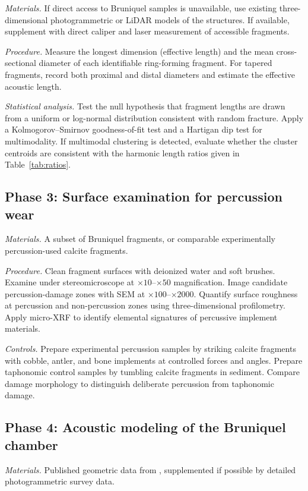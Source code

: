 \documentclass[12pt]{article}
\begin{document}
\textit{Materials.} If direct access to Bruniquel samples is unavailable, use existing three-dimensional photogrammetric or LiDAR models of the structures. If available, supplement with direct caliper and laser measurement of accessible fragments.

\textit{Procedure.} Measure the longest dimension (effective length) and the mean cross-sectional diameter of each identifiable ring-forming fragment. For tapered fragments, record both proximal and distal diameters and estimate the effective acoustic length.

\textit{Statistical analysis.} Test the null hypothesis that fragment lengths are drawn from a uniform or log-normal distribution consistent with random fracture. Apply a Kolmogorov--Smirnov goodness-of-fit test and a Hartigan dip test for multimodality. If multimodal clustering is detected, evaluate whether the cluster centroids are consistent with the harmonic length ratios given in Table~\ref{tab:ratios}.

\subsection*{Phase 3: Surface examination for percussion wear}

\textit{Materials.} A subset of Bruniquel fragments, or comparable experimentally percussion-used calcite fragments.

\textit{Procedure.} Clean fragment surfaces with deionized water and soft brushes. Examine under stereomicroscope at $\times 10$--$\times 50$ magnification. Image candidate percussion-damage zones with SEM at $\times 100$--$\times 2000$. Quantify surface roughness at percussion and non-percussion zones using three-dimensional profilometry. Apply micro-XRF to identify elemental signatures of percussive implement materials.

\textit{Controls.} Prepare experimental percussion samples by striking calcite fragments with cobble, antler, and bone implements at controlled forces and angles. Prepare taphonomic control samples by tumbling calcite fragments in sediment. Compare damage morphology to distinguish deliberate percussion from taphonomic damage.

\subsection*{Phase 4: Acoustic modeling of the Bruniquel chamber}

\textit{Materials.} Published geometric data from \citet{Jaubert2016}, supplemented if possible by detailed photogrammetric survey data.
\end{document}
